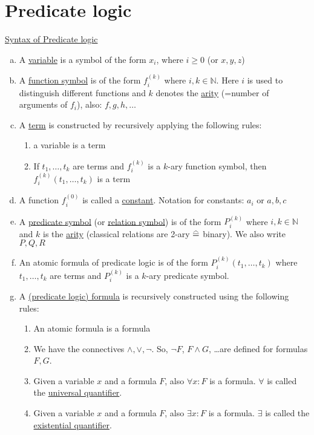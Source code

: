 \documentclass[a4paper]{article}
\renewcommand\hateq{\mathrel{\stackon[1.5pt]{=}{\stretchto{%
				\scalerel*[\widthof{=}]{\wedge}{\rule{1ex}{3ex}}}{0.5ex}}}}
\newcommand{\ul}{\underline}
\begin{document}
\section{Predicate logic}
\ul{Syntax of Predicate logic}
\begin{enumerate}[(a)]
	\item A \ul{variable} is a symbol of the form $x_i$, where $i\geq0$ (or $x,y,z$)
	\item A \ul{function symbol} is of the form $f_i^{(k)}$ where $i,k\in\mathbb{N}$. Here $i$ is used to distinguish different functions and $k$ denotes the \ul{arity} (=number of arguments of $f_i$), also: $f,g,h,\dots$
	\item A \ul{term} is constructed by recursively applying the following rules:
	\begin{enumerate}[(c1)]
		\item a variable is a term
		\item If $t_1,\dots,t_k$ are terms and $f_i^{(k)}$ is a $k$-ary function symbol, then $f_i^{(k)}(t_1,\dots,t_k)$ is a term
	\end{enumerate}
	\item A function $f_i^{(0)}$ is called a \ul{constant}. Notation for constants: $a_i$ or $a,b,c$
	\item A \ul{predicate symbol} (or \ul{relation symbol}) is of the form $P_i^{(k)}$ where $i,k\in\mathbb{N}$ and $k$ is the \ul{arity} (classical relations are 2-ary $\hateq$ binary). We also write $P,Q,R$
	\item An atomic formula of predicate logic is of the form $P_i^{(k)}(t_1,\dots,t_k)$ where $t_1,\dots,t_k$ are terms and $P_i^{(k)}$ is a $k$-ary predicate symbol.
	\item A \ul{(predicate logic) formula} is recursively constructed using the following rules:
	\begin{enumerate}[(g1)]
		\item An atomic formula is a formula
		\item We have the connectives $\wedge,\vee,\neg$. So, $\neg F$, $F\wedge G$, \dots are defined for formulas $F,G$.
		\item Given a variable $x$ and a formula $F$, also $\forall x:F$ is a formula. $\forall$ is called the \ul{universal quantifier}.
		\item Given a variable $x$ and a formula $F$, also $\exists x:F$ is a formula. $\exists$ is called the \ul{existential quantifier}.
	\end{enumerate}
\end{enumerate}
\end{document}
